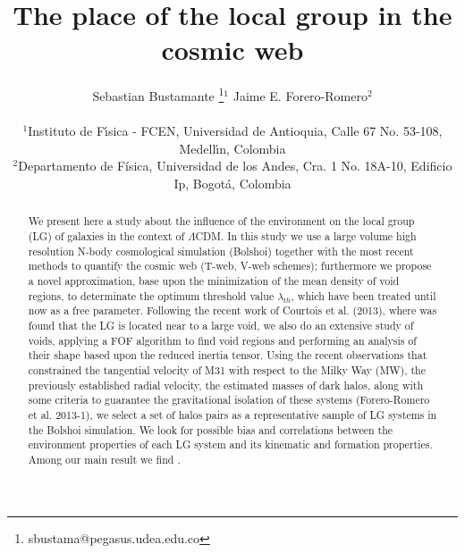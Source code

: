 \documentclass[usenatbib]{latex/mn2e}
\begin{document}
\title{The place of the local group in the cosmic web}
\author[S. Bustamante and J.E. Forero-Romero]{
\parbox[t]{\textwidth}{\raggedright 
  Sebastian Bustamante \thanks{sbustama@pegasus.udea.edu.co}$^{1}$ 
  Jaime E. Forero-Romero$^{2}$ 
}
\vspace*{6pt}\\
$^1$Instituto de F\'{\i}sica - FCEN, Universidad de Antioquia, Calle
67 No. 53-108, Medell\'{\i}n, Colombia\\ 
$^2$Departamento de F\'{i}sica, Universidad de los Andes, Cra. 1
No. 18A-10, Edificio Ip, Bogot\'a, Colombia
}

\maketitle

\begin{abstract}


We present here a study about the influence of the environment on the
local group (LG) of galaxies in the context of $\Lambda$CDM. In this study 
we use a large volume high resolution N-body cosmological simulation 
(Bolshoi) together with the most recent methods to quantify the cosmic web 
(T-web, V-web schemes); furthermore we propose a novel approximation, base
upon the minimization of the mean density of void regions, to determinate 
the optimum threshold value $\lambda_{th}$, which have been treated until 
now as a free parameter. 
Following the recent work of Courtois et al. (2013), where was 
found that the LG is located near to a large void, we also do an extensive 
study of voids, applying a FOF algorithm to find void regions and 
performing an analysis of their shape based upon the reduced inertia 
tensor.
Using the recent observations that constrained the tangential velocity of
M31 with respect to the Milky Way (MW), the previously established radial 
velocity, the estimated masses of dark halos, along with some criteria
to guarantee the gravitational isolation of these systems (Forero-Romero
et al. 2013-1), we select a set of halos pairs as a representative sample 
of LG systems in the Bolshoi simulation. 
We look for possible bias and correlations between the environment 
properties of each LG system and its kinematic and formation properties. 
Among our main result we find .

\end{abstract}
\end{document}
